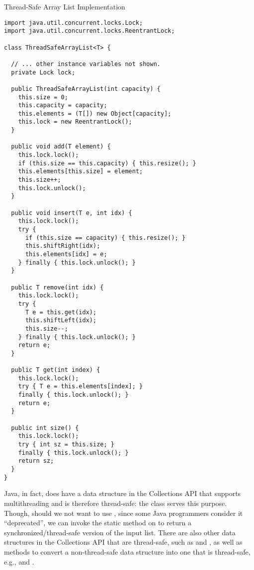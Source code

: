 \begin{cl}[]{Thread-Safe Array List Implementation}
\begin{lstlisting}[language=MyJava]
import java.util.concurrent.locks.Lock;
import java.util.concurrent.locks.ReentrantLock;

class ThreadSafeArrayList<T> {

  // ... other instance variables not shown.
  private Lock lock;

  public ThreadSafeArrayList(int capacity) {
    this.size = 0;
    this.capacity = capacity;
    this.elements = (T[]) new Object[capacity];
    this.lock = new ReentrantLock();
  }

  public void add(T element) {
    this.lock.lock();
    if (this.size == this.capacity) { this.resize(); }
    this.elements[this.size] = element;
    this.size++;
    this.lock.unlock();
  }

  public void insert(T e, int idx) {
    this.lock.lock();
    try {
      if (this.size == capacity) { this.resize(); }
      this.shiftRight(idx);
      this.elements[idx] = e;
    } finally { this.lock.unlock(); }
  }

  public T remove(int idx) {
    this.lock.lock();
    try {
      T e = this.get(idx);
      this.shiftLeft(idx);
      this.size--;
    } finally { this.lock.unlock(); }
    return e;
  }

  public T get(int index) {
    this.lock.lock();
    try { T e = this.elements[index]; }
    finally { this.lock.unlock(); }
    return e;
  }

  public int size() {
    this.lock.lock();
    try { int sz = this.size; }
    finally { this.lock.unlock(); }
    return sz;
  }
}
\end{lstlisting}
\end{cl}

Java, in fact, does have a data structure in the Collections API that supports multithreading and is therefore thread-safe: the  class serves this purpose. Though, should we not want to use , since some Java programmers consider it ``deprecated'', we can invoke the static  method on  to return a synchronized/thread-safe version of the input list. There are also other data structures in the Collections API that are thread-safe, such as  and , as well as methods to convert a non-thread-safe data structure into one that is thread-safe, e.g.,  and .

